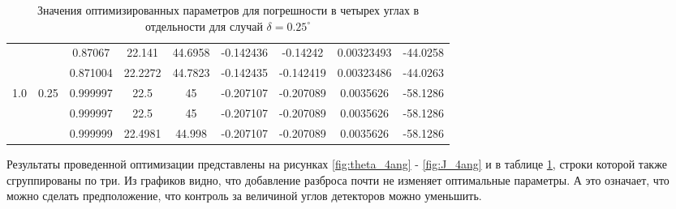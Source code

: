 \documentclass[11pt]{article}
\begin{document}
\begin{table}
\begin{tabular}{|c|c|c|c|c|c|c|c|c|}
 &  & 0.87067 & 22.141 & 44.6958 & -0.142436 & -0.14242 & 0.00323493 & -44.0258\\\cline{3-9}
 &  & 0.871004 & 22.2272 & 44.7823 & -0.142435 & -0.142419 & 0.00323486 & -44.0263\\\hline
\multirow{3}{*}{1.0} & \multirow{3}{*}{0.25} & 0.999997 & 22.5 & 45 & -0.207107 & -0.207089 & 0.0035626 & -58.1286\\\cline{3-9}
 &  & 0.999997 & 22.5 & 45 & -0.207107 & -0.207089 & 0.0035626 & -58.1286\\\cline{3-9}
 &  & 0.999999 & 22.4981 & 44.998 & -0.207107 & -0.207089 & 0.0035626 & -58.1286\\\hline
 \end{tabular}
\caption{Значения оптимизированных параметров для погрешности в четырех углах в отдельности для случай $\delta = 0.25^\circ$}
\label{tab:different_deltas}
\end{table}


Результаты проведенной оптимизации представлены на рисунках \ref{fig:theta_4ang} - \ref{fig:J_4ang} и в таблице \ref{tab:different_deltas}, строки которой также сгруппированы по три. Из графиков видно, что добавление разброса почти не изменяет оптимальные параметры. А это означает, что можно сделать предположение, что контроль за величиной углов детекторов можно уменьшить. 



\end{document}
